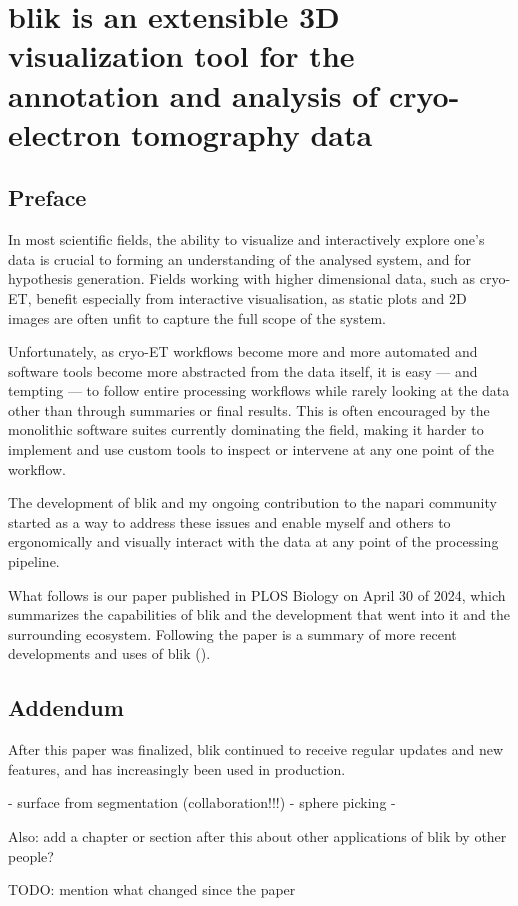 \chapter[blik: a cryo-ET visualisation and analysis tool]{blik is an extensible 3D visualization tool for the annotation and analysis of cryo-electron tomography data}\label{blik}

\localtableofcontents  %

\section{Preface}
In most scientific fields, the ability to visualize and interactively explore one's data is crucial to forming an understanding of the analysed system, and for hypothesis generation.
Fields working with higher dimensional data, such as cryo-ET, benefit especially from interactive visualisation, as static plots and 2D images are often unfit to capture the full scope of the system.

Unfortunately, as cryo-ET workflows become more and more automated and software tools become more abstracted from the data itself, it is easy --- and tempting --- to follow entire processing workflows while rarely looking at the data other than through summaries or final results.
This is often encouraged by the monolithic software suites currently dominating the field, making it harder to implement and use custom tools to inspect or intervene at any one point of the workflow.

The development of blik and my ongoing contribution to the napari community~\cite{thenaparicommunityNapariMultidimensionalImage-} started as a way to address these issues and enable myself and others to ergonomically and visually interact with the data at any point of the processing pipeline.

What follows is our paper published in PLOS Biology on April 30 of 2024, which summarizes the capabilities of blik and the development that went into it and the surrounding ecosystem.
Following the paper is a summary of more recent developments and uses of blik ().



\section{Addendum}\label{blik_addendum}

After this paper was finalized, blik continued to receive regular updates and new features, and has increasingly been used in production.

- surface from segmentation (collaboration!!!)
- sphere picking
- 

Also: add a chapter or section after this about other applications of blik by other people?

TODO: mention what changed since the paper
